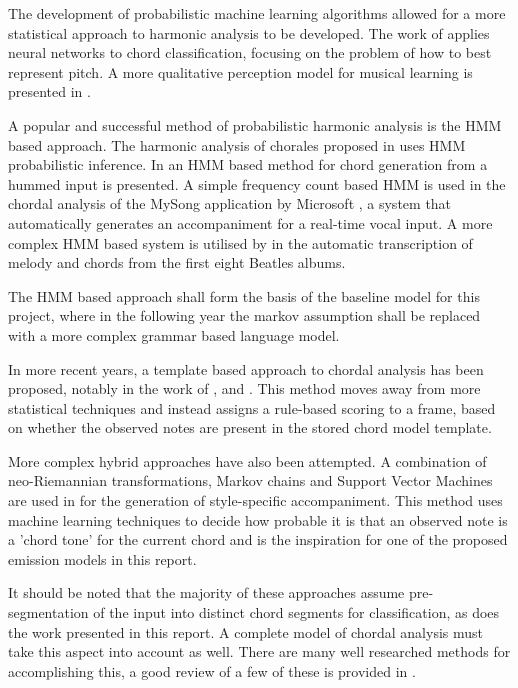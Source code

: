 \documentclass[bsc,singlespacing,logo, parskip, deptreport]{infthesis}
\begin{document}
The development of probabilistic machine learning algorithms allowed for a more statistical approach to harmonic analysis to be developed. The work of \cite{laden1989representation} applies neural networks to chord classification, focusing on the problem of how to best represent pitch. A more qualitative perception model for musical learning is presented in \cite{widmer1992qualitative}.

A popular and successful method of probabilistic harmonic analysis is the HMM based approach. The harmonic analysis of chorales proposed in \cite{allan2005harmonising} uses HMM probabilistic inference. In \cite{lee2004ring} an HMM based method for chord generation from a hummed input is presented. A simple frequency count based HMM is used in the chordal analysis of the MySong application by Microsoft \cite[]{mysong}, a system that automatically generates an accompaniment for a real-time vocal input. A more complex HMM based system is utilised by \cite{ryynanen2008automatic} in the automatic transcription of melody and chords from the first eight Beatles albums.

The HMM based approach shall form the basis of the baseline model for this project, where in the following year the markov assumption shall be replaced with a more complex grammar based language model. 

In more recent years, a template based approach to chordal analysis has been proposed, notably in the work of \cite{pardo2002algorithms}, \cite{oudre2009template} and \cite{oudre2011probabilistic}. This method moves away from more statistical techniques and instead assigns a rule-based scoring to a frame, based on whether the observed notes are present in the stored chord model template.

More complex hybrid approaches have also been attempted. A combination of neo-Riemannian transformations, Markov chains and Support Vector Machines are used in \cite{chuan2007hybrid} for the generation of style-specific accompaniment. This method uses machine learning techniques to decide how probable it is that an observed note is a 'chord tone' for the current chord and is the inspiration for one of the proposed emission models in this report.  

It should be noted that the majority of these approaches assume pre-segmentation of the input into distinct chord segments for classification, as does the work presented in this report. A complete model of chordal analysis must take this aspect into account as well. There are many well researched methods for accomplishing this, a good review of a few of these is provided in \cite{pardo2002algorithms}.
\end{document}
